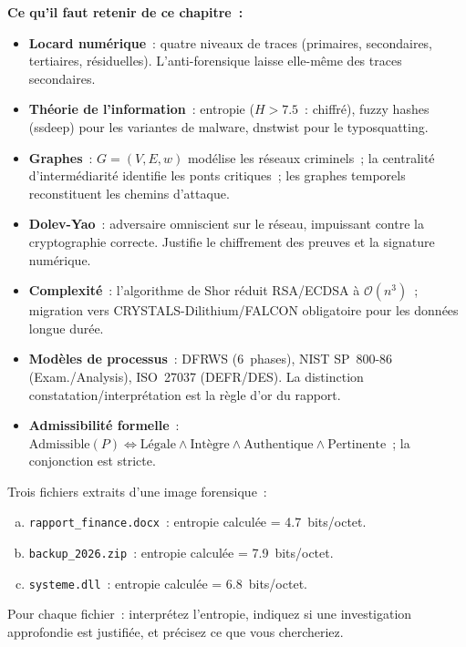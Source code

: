 \begin{boxresume}
\textbf{Ce qu'il faut retenir de ce chapitre~:}

\begin{itemize}
    \item \textbf{Locard numérique}~: quatre niveaux de traces (primaires,
          secondaires, tertiaires, résiduelles). L'anti-forensique laisse
          elle-même des traces secondaires.
    \item \textbf{Théorie de l'information}~: entropie ($H > 7.5$~: chiffré),
          fuzzy hashes (ssdeep) pour les variantes de malware, dnstwist pour
          le typosquatting.
    \item \textbf{Graphes}~: $G = (V,E,w)$ modélise les réseaux criminels~;
          la centralité d'intermédiarité identifie les ponts critiques~;
          les graphes temporels reconstituent les chemins d'attaque.
    \item \textbf{Dolev-Yao}~: adversaire omniscient sur le réseau, impuissant
          contre la cryptographie correcte. Justifie le chiffrement des preuves
          et la signature numérique.
    \item \textbf{Complexité}~: l'algorithme de Shor réduit RSA/ECDSA à
          $\mathcal{O}(n^3)$~; migration vers CRYSTALS-Dilithium/FALCON
          obligatoire pour les données longue durée.
    \item \textbf{Modèles de processus}~: DFRWS (6~phases), NIST SP~800-86
          (Exam./Analysis), ISO~27037 (DEFR/DES). La distinction
          constatation/interprétation est la règle d'or du rapport.
    \item \textbf{Admissibilité formelle}~:
          $\mathrm{Admissible}(P) \iff \mathrm{Légale} \wedge \mathrm{Intègre}
          \wedge \mathrm{Authentique} \wedge \mathrm{Pertinente}$~;
          la conjonction est stricte.
\end{itemize}
\end{boxresume}

\bigskip

\begin{boxexo}[title={\ding{45}\quad Exercice~4.1 --- Entropie et interprétation \niveaubase}]
Trois fichiers extraits d'une image forensique~:
\begin{enumerate}[(a)]
    \item \texttt{rapport\_finance.docx}~: entropie calculée = 4.7~bits/octet.
    \item \texttt{backup\_2026.zip}~: entropie calculée = 7.9~bits/octet.
    \item \texttt{systeme.dll}~: entropie calculée = 6.8~bits/octet.
\end{enumerate}
Pour chaque fichier~: interprétez l'entropie, indiquez si une investigation
approfondie est justifiée, et précisez ce que vous chercheriez.
\end{boxexo}

